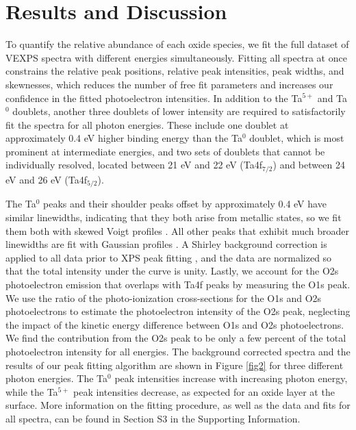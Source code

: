 \documentclass{WileyMSP-template}
\begin{document}
\section{Results and Discussion}

To quantify the relative abundance of each oxide species, we fit the full dataset of VEXPS spectra with different energies simultaneously. Fitting all spectra at once constrains the relative peak positions, relative peak intensities, peak widths, and skewnesses, which reduces the number of free fit parameters and increases our confidence in the fitted photoelectron intensities. In addition to the Ta$^{5+}$ and Ta$^{0}$ doublets, another three doublets of lower intensity are required to satisfactorily fit the spectra for all photon energies. These include one doublet at approximately 0.4 eV higher binding energy than the Ta$^0$ doublet, which is most prominent at intermediate energies, and two sets of doublets that cannot be individually resolved, located between 21 eV and 22 eV (Ta4f$_{7/2}$) and between 24 eV and 26 eV (Ta4f$_{5/2}$). 

The Ta$^0$ peaks and their shoulder peaks offset by approximately 0.4 eV have similar linewidths, indicating that they both arise from metallic states, so we fit them both with skewed Voigt profiles \cite{sherwood_use_2019}. All other peaks that exhibit much broader linewidths are fit with Gaussian profiles \cite{sherwood_use_2019}. A Shirley background correction is applied to all data prior to XPS peak fitting \cite{engelhard_introductory_2020}, and the data are normalized so that the total intensity under the curve is unity. Lastly, we account for the O2s photoelectron emission that overlaps with Ta4f peaks \cite{Moulder:1992} by measuring the O1s peak. We use the ratio of the photo-ionization cross-sections for the O1s and O2s photoelectrons \cite{O2s_cross_section:2022} to estimate the photoelectron intensity of the O2s peak, neglecting the impact of the kinetic energy difference between O1s and O2s photoelectrons. We find the contribution from the O2s peak to be only a few percent of the total photoelectron intensity for all energies. The background corrected spectra and the results of our peak fitting algorithm are shown in Figure \ref{fig2} for three different photon energies. The Ta$^0$ peak intensities increase with increasing photon energy, while the Ta$^{5+}$ peak intensities decrease, as expected for an oxide layer at the surface. More information on the fitting procedure, as well as the data and fits for all spectra, can be found in Section S3 in the Supporting Information.
\end{document}
